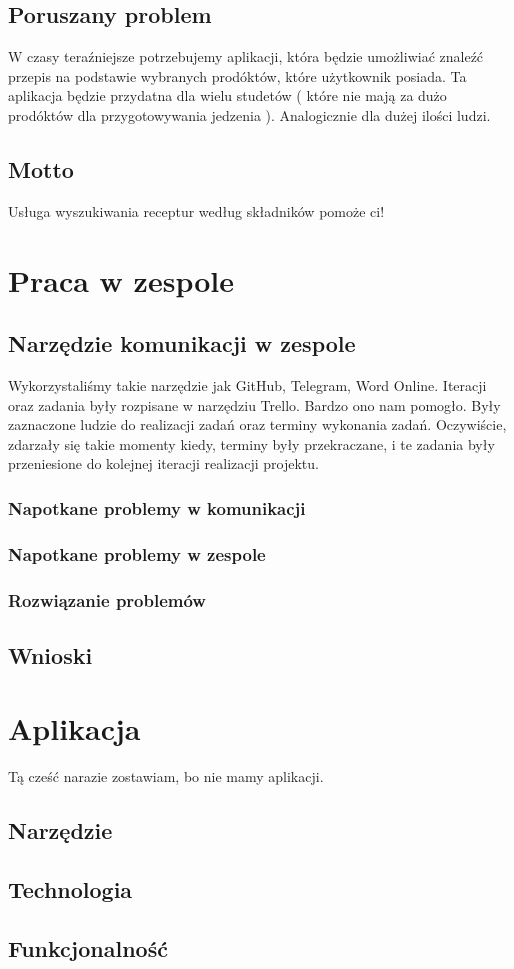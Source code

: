 \documentclass[a4paper, 12pt]{article}
\begin{document}
		\subsection{Poruszany problem}
			\hspace*{1cm} W czasy teraźniejsze potrzebujemy aplikacji, która będzie umożliwiać znaleźć przepis na podstawie wybranych prodóktów, które użytkownik posiada. 
			Ta aplikacja będzie przydatna dla wielu studetów ( które nie mają za dużo  prodóktów dla przygotowywania jedzenia ). Analogicznie dla dużej ilości ludzi.
        \subsection{Motto} Usługa wyszukiwania receptur według składników pomoże ci!
\newpage

\section{Praca w zespole}
\subsection{Narzędzie komunikacji w zespole}
\hspace*{1cm} Wykorzystaliśmy takie narzędzie jak GitHub, Telegram, Word Online.\newline
\hspace*{1cm} Iteracji oraz zadania były rozpisane w narzędziu Trello. Bardzo ono nam pomogło.
Były zaznaczone ludzie do realizacji zadań oraz terminy wykonania zadań. Oczywiście, zdarzały się takie momenty kiedy, terminy były przekraczane, i te zadania były przeniesione do kolejnej iteracji realizacji projektu.
\subsubsection{Napotkane problemy w komunikacji}
\subsubsection{Napotkane problemy w zespole}
\subsubsection{Rozwiązanie problemów}
\subsection{Wnioski}
\section{Aplikacja}
Tą cześć narazie zostawiam, bo nie mamy aplikacji.
\subsection{Narzędzie}
\subsection{Technologia}
\subsection{Funkcjonalność}
\label{LastPage}~
\label{LastPageOfBackMatter}~		
\end{document}
